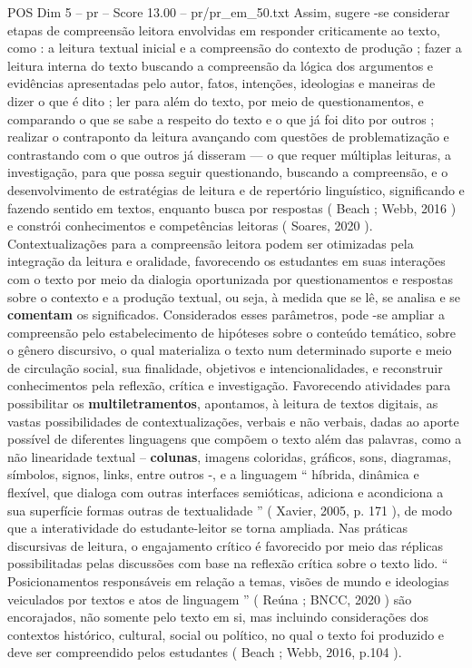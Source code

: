\begin{textsample}{POS Dim 5 – pr – Score 13.00 – pr/pr\_em\_50.txt}
Assim, sugere -se considerar etapas de compreensão leitora envolvidas em responder criticamente ao texto, como : a leitura textual inicial e a compreensão do contexto de produção ; fazer a leitura interna do texto buscando a compreensão da lógica dos argumentos e evidências apresentadas pelo autor, fatos, intenções, ideologias e maneiras de dizer o que é dito ; ler para além do texto, por meio de questionamentos, e comparando o que se sabe a respeito do texto e o que já foi dito por outros ; realizar o contraponto da leitura avançando com questões de problematização e contrastando com o que outros já disseram — o que requer múltiplas leituras, a investigação, para que possa seguir questionando, buscando a compreensão, e o desenvolvimento de estratégias de leitura e de repertório linguístico, significando e fazendo sentido em textos, enquanto busca por respostas ( Beach ; Webb, 2016 ) e constrói conhecimentos e competências leitoras ( Soares, 2020 ).
Contextualizações para a compreensão leitora podem ser otimizadas pela integração da leitura e oralidade, favorecendo os estudantes em suas interações com o texto por meio da dialogia oportunizada por questionamentos e respostas sobre o contexto e a produção textual, ou seja, à medida que se lê, se analisa e se \textbf{comentam} os significados.
Considerados esses parâmetros, pode -se ampliar a compreensão pelo estabelecimento de hipóteses sobre o conteúdo temático, sobre o gênero discursivo, o qual materializa o texto num determinado suporte e meio de circulação social, sua finalidade, objetivos e intencionalidades, e reconstruir conhecimentos pela reflexão, crítica e investigação.
Favorecendo atividades para possibilitar os \textbf{multiletramentos}, apontamos, à leitura de textos digitais, as vastas possibilidades de contextualizações, verbais e não verbais, dadas ao aporte possível de diferentes linguagens que compõem o texto além das palavras, como a não linearidade textual – \textbf{colunas}, imagens coloridas, gráficos, sons, diagramas, símbolos, signos, links, entre outros -, e a linguagem “ híbrida, dinâmica e flexível, que dialoga com outras interfaces semióticas, adiciona e acondiciona a sua superfície formas outras de textualidade ” ( Xavier, 2005, p. 171 ), de modo que a interatividade do estudante-leitor se torna ampliada.
Nas práticas discursivas de leitura, o engajamento crítico é favorecido por meio das réplicas possibilitadas pelas discussões com base na reflexão crítica sobre o texto lido. “ Posicionamentos responsáveis em relação a temas, visões de mundo e ideologias veiculados por textos e atos de linguagem ” ( Reúna ; BNCC, 2020 ) são encorajados, não somente pelo texto em si, mas incluindo considerações dos contextos histórico, cultural, social ou político, no qual o texto foi produzido e deve ser compreendido pelos estudantes ( Beach ; Webb, 2016, p.104 ).

\end{textsample}
